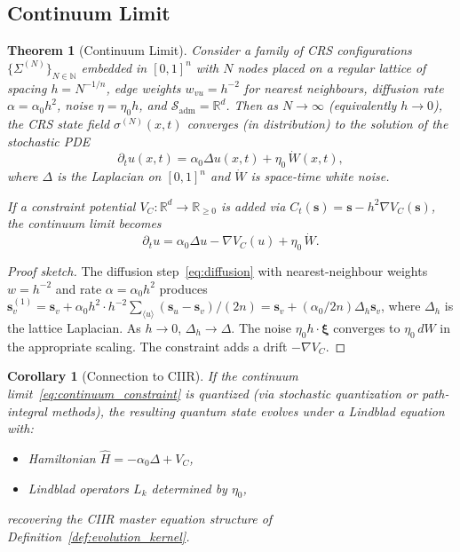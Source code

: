 \documentclass[11pt,a4paper]{article}
\newtheorem{theorem}[definition]{Theorem}
\newtheorem{corollary}[definition]{Corollary}
\theoremstyle{remark}
\newcommand{\hatH}{\hat{H}}
\begin{document}
\subsection{Continuum Limit}

\begin{theorem}[Continuum Limit]
\label{thm:continuum}
Consider a family of CRS configurations
$\{\Sigma^{(N)}\}_{N \in \mathbb{N}}$ embedded in $[0,1]^n$ with
$N$ nodes placed on a regular lattice of spacing $h = N^{-1/n}$,
edge weights $w_{vu} = h^{-2}$ for nearest neighbours, diffusion
rate $\alpha = \alpha_0 h^2$, noise $\eta = \eta_0 h$, and
$\mathcal{S}_{\mathrm{adm}} = \mathbb{R}^d$.  Then as $N \to \infty$
(equivalently $h \to 0$), the CRS state field
$\sigma^{(N)}(x, t)$ converges (in distribution) to the solution of
the stochastic PDE
\begin{equation}
\label{eq:continuum}
  \partial_t u(x,t) =
    \alpha_0 \Delta u(x,t) + \eta_0 \, \dot{W}(x,t),
\end{equation}
where $\Delta$ is the Laplacian on $[0,1]^n$ and $\dot{W}$ is
space-time white noise.

If a constraint potential $V_C: \mathbb{R}^d \to \mathbb{R}_{\geq 0}$
is added via $C_t(\mathbf{s}) = \mathbf{s} - h^2 \nabla V_C(\mathbf{s})$,
the continuum limit becomes
\begin{equation}
\label{eq:continuum_constraint}
  \partial_t u =
    \alpha_0 \Delta u - \nabla V_C(u) + \eta_0 \, \dot{W}.
\end{equation}
\end{theorem}

\begin{proof}[Proof sketch]
The diffusion step~\eqref{eq:diffusion} with nearest-neighbour weights
$w = h^{-2}$ and rate $\alpha = \alpha_0 h^2$ produces
$\mathbf{s}^{(1)}_v = \mathbf{s}_v + \alpha_0 h^2 \cdot h^{-2}
\sum_{\langle u \rangle} (\mathbf{s}_u - \mathbf{s}_v) / (2n)
= \mathbf{s}_v + (\alpha_0 / 2n) \Delta_h \mathbf{s}_v$, where
$\Delta_h$ is the lattice Laplacian.  As $h \to 0$,
$\Delta_h \to \Delta$.  The noise $\eta_0 h \cdot \boldsymbol{\xi}$
converges to $\eta_0 \, dW$ in the appropriate scaling.
The constraint adds a drift $-\nabla V_C$.
\end{proof}

\begin{corollary}[Connection to CIIR]
\label{cor:crs_ciir}
If the continuum limit~\eqref{eq:continuum_constraint} is quantized
(via stochastic quantization or path-integral methods), the resulting
quantum state evolves under a Lindblad equation with:
\begin{itemize}
  \item Hamiltonian $\hatH = -\alpha_0 \Delta + V_C$,
  \item Lindblad operators $L_k$ determined by $\eta_0$,
\end{itemize}
recovering the CIIR master equation structure of
Definition~\ref{def:evolution_kernel}.
\end{corollary}
\end{document}
